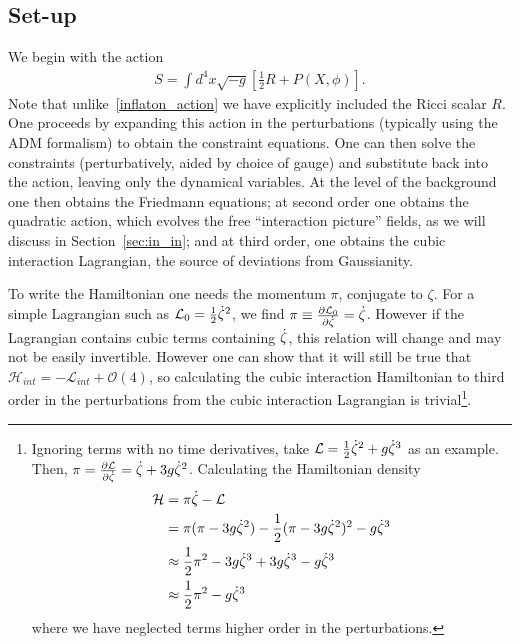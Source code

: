     \subsection{Set-up}
    We begin with the action
    \begin{align}\label{gr_action}
        S=\int d^4x\sqrt{-g}\left[\frac{1}{2}R+P(X, \phi)\right].
    \end{align}
    Note that unlike~\eqref{inflaton_action} we have explicitly included the
    Ricci scalar $R$.
    One proceeds by expanding this action in the perturbations (typically
    using the ADM formalism)
    to obtain the constraint equations. One can then solve the constraints
    (perturbatively, aided by choice of gauge) and substitute
    back into the action, leaving only the dynamical variables.
    At the level of the background one then obtains the Friedmann equations;
    at second order one obtains the quadratic action, which evolves the
    free ``interaction picture'' fields, as we will discuss in Section~\ref{sec:in_in};
    and at third order, one obtains the cubic
    interaction Lagrangian, the source of deviations from Gaussianity.


    To write the Hamiltonian one needs the momentum $\pi$, conjugate to $\zeta$.
    For a simple Lagrangian such as $\mathcal{L}_{0}=\frac{1}{2}\dot{\zeta}^2$,
    we find $\pi\equiv\frac{\partial \mathcal{L}_0}{\partial \dot{\zeta}}=\dot{\zeta}$. However if the Lagrangian contains cubic terms
    containing $\dot{\zeta}$, this relation will change and may not be easily invertible.
    However one can show that it will still be true that $\mathcal{H}_{int}=-\mathcal{L}_{int}+\mathcal{O}(4)$,
    so calculating the cubic interaction Hamiltonian to third order in the perturbations
    from the cubic interaction Lagrangian is trivial\footnote{
        Ignoring terms with no time derivatives, take $\mathcal{L}=\frac{1}{2}\dot{\zeta}^2+g\dot{\zeta}^3$
        as an example.
        Then, $\pi=\frac{\partial\mathcal{L}}{\partial \dot{\zeta}}=\dot{\zeta}+3g\dot{\zeta}^2$.
        Calculating the Hamiltonian density
        \begin{align}
            \mathcal{H} &= \pi\dot{\zeta} - \mathcal{L}\\
                    &= \pi(\pi-3g\dot{\zeta}^2) - \frac{1}{2}(\pi-3g\dot{\zeta}^2)^2-g\dot{\zeta}^3\\
                    &\approx \frac{1}{2}\pi^2-3g\dot{\zeta}^3 +3g\dot{\zeta}^3-g\dot{\zeta}^3\\
                    &\approx \frac{1}{2}\pi^2-g\dot{\zeta}^3
        \end{align}
        where we have neglected terms higher order in the perturbations.
    }.


